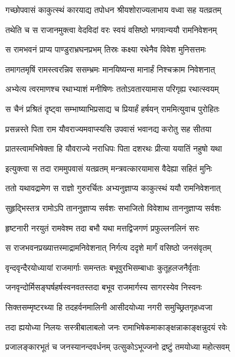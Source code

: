 \twolineshloka
{गच्छोपवासं काकुत्स्थं कारयाद्य तपोधन}
{श्रीयशोराज्यलाभाय वध्वा सह यतव्रतम्} %

\twolineshloka
{तथेति च स राजानमुक्त्वा वेदविदां वरः}
{स्वयं वसिष्ठो भगवान्ययौ रामनिवेशनम्} %

\twolineshloka
{स रामभवनं प्राप्य पाण्डुराभ्रघनप्रभम्}
{तिस्रः कक्ष्या रथेनैव विवेश मुनिसत्तमः} %

\twolineshloka
{तमागतमृषिं रामस्त्वरन्निव ससम्भ्रमः}
{मानयिष्यन्स मानार्हं निश्चक्राम निवेशनात्} %

\twolineshloka
{अभ्येत्य त्वरमाणश्च रथाभ्याशं मनीषिणः}
{ततोऽवतारयामास परिगृह्य रथात्स्वयम्} %

\twolineshloka
{स चैनं प्रश्रितं दृष्ट्वा सम्भाष्याभिप्रसाद्य च}
{प्रियार्हं हर्षयन् राममित्युवाच पुरोहितः} %

\twolineshloka
{प्रसन्नस्ते पिता राम यौवराज्यमवाप्स्यसि}
{उपवासं भवानद्य करोतु सह सीतया} %

\twolineshloka
{प्रातस्त्वामभिषेक्ता हि यौवराज्ये नराधिपः}
{पिता दशरथः प्रीत्या ययातिं नहुषो यथा} %

\twolineshloka
{इत्युक्त्वा स तदा राममुपवासं यतव्रतम्}
{मन्त्रवत्कारयामास वैदेह्या सहितं मुनिः} %

\twolineshloka
{ततो यथावद्रामेण स राज्ञो गुरुरर्चितः}
{अभ्यनुज्ञाप्य काकुत्स्थं ययौ रामनिवेशनात्} %

\twolineshloka
{सुहृद्भिस्तत्र रामोऽपि ताननुज्ञाप्य सर्वशः}
{सभाजितो विवेशाथ ताननुज्ञाप्य सर्वशः} %

\twolineshloka
{हृष्टनारी नरयुतं रामवेश्म तदा बभौ}
{यथा मत्तद्विजगणं प्रफुल्लनलिनं सरः} %

\twolineshloka
{स राजभवनप्रख्यात्तस्माद्रामनिवेशनात्}
{निर्गत्य ददृशे मार्गं वसिष्ठो जनसंवृतम्} %

\twolineshloka
{वृन्दवृन्दैरयोध्यायां राजमार्गाः समन्ततः}
{बभूवुरभिसम्बाधाः कुतूहलजनैर्वृताः} %

\twolineshloka
{जनवृन्दोर्मिसङ्घर्षहर्षस्वनवतस्तदा}
{बभूव राजमार्गस्य सागरस्येव निस्वनः} %

\twolineshloka
{सिक्तसम्मृष्टरथ्या हि तदहर्वनमालिनी}
{आसीदयोध्या नगरी समुच्छ्रितगृहध्वजा} %

\twolineshloka
{तदा ह्ययोध्या निलयः सस्त्रीबालाबलो जनः}
{रामाभिषेकमाकाङ्क्षन्नाकाङ्क्षन्नुदयं रवेः} %

\twolineshloka
{प्रजालङ्कारभूतं च जनस्यानन्दवर्धनम्}
{उत्सुकोऽभूज्जनो द्रष्टुं तमयोध्या महोत्सवम्} %

